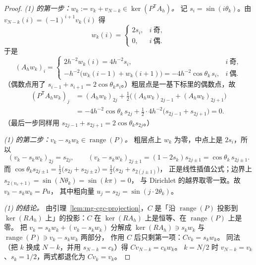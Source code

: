 \begin{proof}
\emph{(1) 的第一步：$w_k:=v_k+v_{N-k}\in\ker(P^{\mathsf T}A_h)$。}
记 $s_i=\sin(i\theta_k)$。由 $v_{N-k}(i)=(-1)^{i+1}v_k(i)$ 得
\begin{equation}
  w_k(i)=\begin{cases}2s_i,& i\ \text{奇},\\ 0,& i\ \text{偶}.\end{cases}
\end{equation}
于是
\begin{equation}
  (A_hw_k)_i=\begin{cases}
    2h^{-2}w_k(i)=4h^{-2}s_i, & i\ \text{奇},\\[2pt]
    -h^{-2}\bigl(w_k(i-1)+w_k(i+1)\bigr)=-4h^{-2}\cos\theta_k\,s_i, & i\ \text{偶}.
  \end{cases}
\end{equation}
（偶数点用了 $s_{i-1}+s_{i+1}=2\cos\theta_k s_i$。）粗层点是一基下标里的偶数点，故
\begin{equation}
  \begin{aligned}
    (P^{\mathsf T}A_hw_k)_j
    &=(A_hw_k)_{2j}+\tfrac12\bigl((A_hw_k)_{2j-1}+(A_hw_k)_{2j+1}\bigr)\\
    &=-4h^{-2}\cos\theta_k\,s_{2j}+\tfrac12\cdot 4h^{-2}\bigl(s_{2j-1}+s_{2j+1}\bigr)=0 .
  \end{aligned}
\end{equation}
（最后一步同样用 $s_{2j-1}+s_{2j+1}=2\cos\theta_k s_{2j}$。）

\emph{(1) 的第二步：$v_k-s_kw_k\in\operatorname{range}(P)$。}
粗层点上 $w_k$ 为零，中点上是 $2s_i$，所以
\begin{equation}
  (v_k-s_kw_k)_{2j}=s_{2j},\qquad
  (v_k-s_kw_k)_{2j\pm1}=(1-2s_k)s_{2j\pm1}=\cos\theta_k\,s_{2j\pm1}.
\end{equation}
而 $\cos\theta_k s_{2j\pm1}=\frac12\bigl(s_{2j}+s_{2j\pm2}\bigr)=\frac12\bigl(s_{2j}+s_{2(j\pm1)}\bigr)$，
正是线性插值公式；边界上 $s_{2(n_c+1)}=\sin(N\theta_k)=\sin(k\pi)=0$，
与 Dirichlet 的越界取零一致。故 $v_k-s_kw_k=Pu$，
其中粗向量 $u_j=s_{2j}=\sin(j\cdot2\theta_k)$。

\emph{(1) 的结论。} 由引理~\ref{lem:mg-cgc-projection}，$C$ 是「沿 $\operatorname{range}(P)$
投影到 $\ker(RA_h)$ 上」的投影：$C$ 在 $\ker(RA_h)$ 上是恒等、在 $\operatorname{range}(P)$ 上是零。
把 $v_k=s_kw_k+(v_k-s_kw_k)$ 分解成
$\ker(RA_h)\ni s_kw_k$ 与 $\operatorname{range}(P)\ni v_k-s_kw_k$ 两部分，
作用 $C$ 后只剩第一项：$Cv_k=s_kw_k$。
同法（把 $k$ 换成 $N-k$，并用 $s_{N-k}=c_k$）得 $Cv_{N-k}=c_kw_k$。
$k=N/2$ 时 $v_{N-k}=v_k$、$s_k=1/2$，两式都退化为 $Cv_k=v_k$。


\end{proof}
